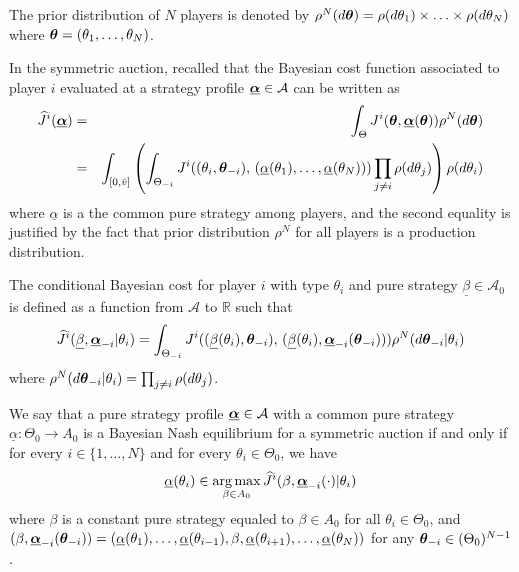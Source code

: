 The prior distribution of $N$ players is denoted by $\rho^N(d\boldsymbol{\theta}) = \rho(d\theta_1) \times \ldots \times \rho(d\theta_N)$ where $\boldsymbol{\theta} = (\theta_1, \ldots, \theta_N)$.


In the symmetric auction, recalled that the Bayesian cost function associated to player $i$ evaluated at a strategy profile $\underline{\boldsymbol{\alpha}} \in \mathcal{A}$ can be written as
\begin{eqnarray}
	\widehat{J}^i(\underline{\boldsymbol{\alpha}}) &=& \int_{\Theta} J^i(\boldsymbol{\theta}, \underline{\boldsymbol{\alpha}}(\boldsymbol{\theta}) ) \rho^N(d\boldsymbol{\theta}) \nonumber \\
	&=& \int_{[0, \bar{v}]}\left( \int_{\Theta_{-i}}  J^i((\theta_i, \boldsymbol{\theta}_{-i}), \,  (\underline{\alpha}(\theta_1), \ldots, \underline{\alpha}(\theta_N) ) ) \prod_{j\neq i}\rho(d\theta_j) \right) \rho(d\theta_i)
\end{eqnarray}
where $\underline{\alpha}$ is a the common pure strategy among players, and the second equality is justified by the fact that prior distribution $\rho^N$ for all players is a production distribution.

\begin{definition}
	The conditional Bayesian cost for player $i$ with type $\theta_i$ and pure strategy $\underline{\beta} \in \mathcal{A}_0$ is defined as a function from $\mathcal{A}$ to $\mathbb{R}$ such that
	$$
		\widehat{J}^i(\underline{\beta}, \underline{\boldsymbol{\alpha}}_{-i} | \theta_i) = \int_{\Theta_{-i}} J^i( (\underline{\beta}(\theta_i), \boldsymbol{\theta}_{-i}), \, (\underline{\beta}(\theta_i), \underline{\boldsymbol{\alpha}}_{-i}(\boldsymbol{\theta}_{-i} ) ) ) \rho^{N}(d\boldsymbol{\theta}_{-i}| \theta_i )
	$$
 	where $\rho^{N}(d\boldsymbol{\theta}_{-i} | \theta_i) = \prod_{j \neq i} \rho(d\theta_j)$.
\end{definition}


\begin{definition}
	We say that a pure strategy profile $\underline{\boldsymbol{\alpha}} \in \mathcal{A}$ with a common pure strategy $\underline{\alpha}:\Theta_0 \to A_0$ is a Bayesian Nash equilibrium for a symmetric auction if and only if for every $i \in \{1,\ldots,N\}$ and for every $\theta_i \in \Theta_0$, we have
	\begin{equation}
		\underline{\alpha}(\theta_i) \in \operatorname*{arg\,max}_{\beta \in A_0} \widehat{J}^i( \beta, \underline{\boldsymbol{\alpha}}_{-i}(\cdot) | \theta_i)
	\end{equation}
	where $\beta$ is a constant pure strategy equaled to $\beta \in A_0$ for all $\theta_i \in \Theta_0$, and $(\beta, \underline{\boldsymbol{\alpha}}_{-i}(\boldsymbol{\theta}_{-i} ) ) = (\underline{\alpha}(\theta_1), \ldots, \underline{\alpha}(\theta_{i-1}), \beta, \underline{\alpha}(\theta_{i+1}), \ldots, \underline{\alpha}(\theta_N) )$ for any $\boldsymbol{\theta}_{-i} \in (\Theta_0)^{N-1}$.
\end{definition}


